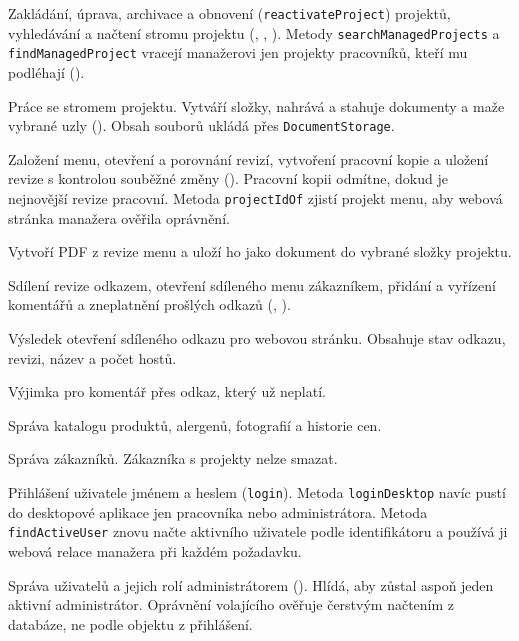 \begin{description}[itemsep=2pt,style=unboxed]
  \item[\texttt{ProjectService}] Zakládání, úprava, archivace a obnovení (\texttt{reactivateProject}) projektů, vyhledávání a načtení stromu projektu (, , ). Metody \texttt{searchManagedProjects} a \texttt{findManagedProject} vracejí manažerovi jen projekty pracovníků, kteří mu podléhají ().
  \item[\texttt{DocumentService}] Práce se stromem projektu. Vytváří složky, nahrává a stahuje dokumenty a maže vybrané uzly (). Obsah souborů ukládá přes \texttt{DocumentStorage}.
  \item[\texttt{MenuService}] Založení menu, otevření a porovnání revizí, vytvoření pracovní kopie a uložení revize s kontrolou souběžné změny (). Pracovní kopii odmítne, dokud je nejnovější revize pracovní. Metoda \texttt{projectIdOf} zjistí projekt menu, aby webová stránka manažera ověřila oprávnění.
  \item[\texttt{MenuExportService}] Vytvoří PDF z revize menu a uloží ho jako dokument do vybrané složky projektu.
  \item[\texttt{SharingService}] Sdílení revize odkazem, otevření sdíleného menu zákazníkem, přidání a vyřízení komentářů a zneplatnění prošlých odkazů (, ).
  \item[\texttt{SharedMenuView}] Výsledek otevření sdíleného odkazu pro webovou stránku. Obsahuje stav odkazu, revizi, název a počet hostů.
  \item[\texttt{LinkNotValidException}] Výjimka pro komentář přes odkaz, který už neplatí.
  \item[\texttt{CatalogService}] Správa katalogu produktů, alergenů, fotografií a historie cen.
  \item[\texttt{CustomerService}] Správa zákazníků. Zákazníka s projekty nelze smazat.
  \item[\texttt{AuthService}] Přihlášení uživatele jménem a heslem (\texttt{login}). Metoda \texttt{loginDesktop} navíc pustí do desktopové aplikace jen pracovníka nebo administrátora. Metoda \texttt{findActiveUser} znovu načte aktivního uživatele podle identifikátoru a používá ji webová relace manažera při každém požadavku.
  \item[\texttt{UserService}] Správa uživatelů a jejich rolí administrátorem (). Hlídá, aby zůstal aspoň jeden aktivní administrátor. Oprávnění volajícího ověřuje čerstvým načtením z databáze, ne podle objektu z přihlášení.
\end{description}


